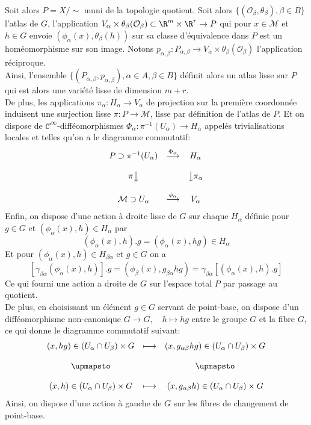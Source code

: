 Soit alors $P = X/\sim$ muni de la topologie quotient. Soit alors $\{(\mathcal{O}_\beta, \theta_\beta), \beta \in B\}$ l'atlas de $G$, l'application $V_\alpha \times \theta_\beta(\mathcal{O}_\beta) \subset \R^m \times \R^r \to P$ qui pour $x\in \mathcal{M}$ et $h\in G$ envoie $(\phi_\alpha(x), \theta_\beta(h))$ sur sa classe d'équivalence dans $P$ est un homéomorphisme sur son image. Notons $p_{\alpha, \beta} : P_{\alpha, \beta} \to V_\alpha \times \theta_\beta(\mathcal{O}_\beta)$ l'application réciproque. \\

Ainsi, l'ensemble $\{(P_{\alpha, \beta}, p_{\alpha, \beta}), \alpha\in A, \beta\in B\}$ définit alors un atlas lisse sur $P$ qui est alors une variété lisse de dimension $m+r$. \\

De plus, les applications $\pi_\alpha: H_\alpha \to V_\alpha$ de projection sur la première coordonnée induisent une surjection lisse $\pi : P \to \mathcal{M}$, lisse par définition de l'atlas de $P$. Et on dispose de $\mathscr{C}^\infty$-difféomorphismes $\Phi_\alpha : \pi^{-1}(U_\alpha) \to H_\alpha$ appelés trivialisations locales et telles qu'on a le diagramme commutatif:
$$\begin{matrix}
P \supset \pi^{-1}(U_\alpha) & \overset{\Phi_\alpha}{\longrightarrow} & H_\alpha \\ \\
\pi\big\downarrow &  & \big\downarrow\pi_\alpha \\ \\
\mathcal{M} \supset U_\alpha & \overset{\phi_\alpha}{\longrightarrow} & V_\alpha 
\end{matrix}
$$
Enfin, on dispose d'une action à droite lisse de $G$ sur chaque $H_\alpha$ définie pour $g\in G$ et $(\phi_\alpha(x), h)\in H_\alpha$ par 
$$(\phi_\alpha(x), h).g = (\phi_\alpha(x), hg) \in H_\alpha$$
Et pour $(\phi_\alpha(x), h) \in H_{\beta\alpha}$ et $g\in G$ on a 
$$[\gamma_{\beta\alpha}(\phi_\alpha(x), h)].g = (\phi_\beta(x), g_{\beta\alpha}hg) = \gamma_{\beta\alpha}[(\phi_\alpha(x), h).g]$$ 
Ce qui fourni une action a droite de $G$ sur l'espace total $P$ par passage au quotient. \\

De plus, en choisissant un élément $g\in G$ servant de point-base, on dispose d'un difféomorphisme non-canonique $G \to G, \quad h \mapsto hg$ entre le groupe $G$ et la fibre $G$, ce qui donne le diagramme commutatif suivant:
$$\begin{matrix}
(x, hg) \in (U_\alpha \cap U_\beta) \times G & \longmapsto & (x, g_{\alpha\beta}hg) \in (U_\alpha \cap U_\beta) \times G\\ \\
\upmapsto &  & \upmapsto \\ \\
(x, h) \in (U_\alpha \cap U_\beta) \times G & \longmapsto & (x, g_{\alpha\beta}h) \in (U_\alpha \cap U_\beta) \times G
\end{matrix}
$$
Ainsi, on dispose d'une action à gauche de $G$ sur les fibres de changement de point-base. \\

